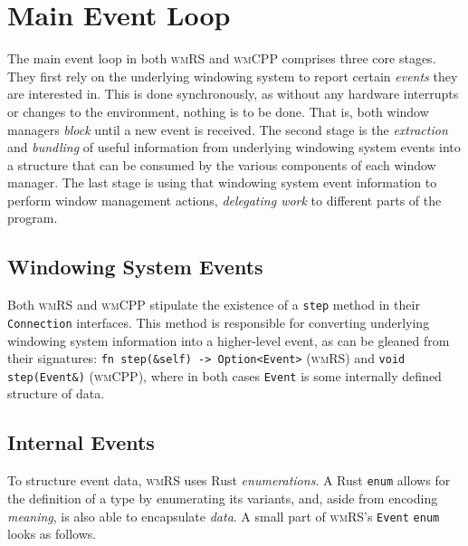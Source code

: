 \section{Main Event Loop}

The main  event loop  in both \textsc{wmRS}  and \textsc{wmCPP}  comprises three
core  stages. They  first  rely on  the underlying  windowing  system to  report
certain \textit{events} they  are interested in. This is  done synchronously, as
without any hardware interrupts or changes  to the environment, nothing is to be
done.  That  is, both  window  managers  \textit{block}  until  a new  event  is
received. The second  stage is the \textit{extraction}  and \textit{bundling} of
useful information from underlying windowing system events into a structure that
can be consumed by the various components of each window manager. The last stage
is using  that windowing system  event information to perform  window management
actions, \textit{delegating work} to different parts of the program.

\subsection{Windowing System Events}

Both \textsc{wmRS} and \textsc{wmCPP} stipulate the existence of a \texttt{step}
method in their  \texttt{Connection} interfaces. This method  is responsible for
converting underlying  windowing system  information into a  higher-level event,
as  can  be  gleaned  from their  signatures:  \texttt{fn  step(&self)
->  Option<Event>}   (\textsc{wmRS})  and   \texttt{void  step(Event&)}
(\textsc{wmCPP}), where in both cases  \texttt{Event} is some internally defined
structure of data.

\subsection{Internal Events}


To structure event  data, \textsc{wmRS} uses Rust  \textit{enumerations}. A Rust
\texttt{enum}  allows for  the  definition of  a  type by  enumerating
its  variants,  and, aside  from  encoding  \textit{meaning},  is also  able  to
encapsulate  \textit{data}\cite{therustbook}. A  small  part of  \textsc{wmRS}'s
\texttt{Event} \texttt{enum} looks as follows.

